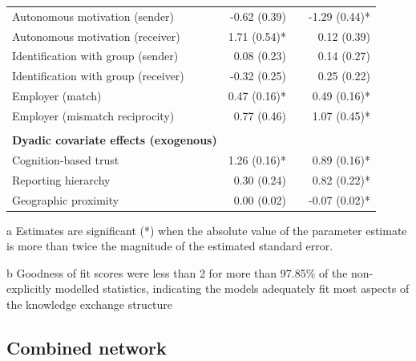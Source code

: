 \begin{table}[hbt!]
{\begin{threeparttable}
\begin{tabular}{@{}lrlr@{}}
Autonomous motivation (sender) & -0.62 (0.39)\phantom{*} &  & -1.29 (0.44)* \\
Autonomous motivation (receiver) & 1.71 (0.54)* &  & 0.12 (0.39)\phantom{*} \\
Identification with group (sender) & 0.08 (0.23)\phantom{*} &  & 0.14 (0.27)\phantom{*} \\
Identification with group (receiver) & -0.32 (0.25)\phantom{*} &  & 0.25 (0.22)\phantom{*} \\
Employer (match) & 0.47 (0.16)* &  & 0.49 (0.16)* \\
Employer (mismatch reciprocity) & 0.77 (0.46)\phantom{*} &  & 1.07 (0.45)* \\
 &  &  &  \\
\textbf{Dyadic covariate effects (exogenous)} &  &  &  \\
Cognition-based trust & 1.26 (0.16)* &  & 0.89 (0.16)* \\
Reporting hierarchy & 0.30 (0.24)\phantom{*} &  & 0.82 (0.22)* \\
Geographic proximity & 0.00 (0.02)\phantom{*} &  & -0.07 (0.02)* \\ \bottomrule
\end{tabular}
    \begin{tablenotes}
      \small
      \item[a] Estimates are significant (*) when the absolute value of the parameter estimate is more than twice the magnitude of the estimated standard error.
      \item[b] Goodness of fit scores were less than 2 for more than 97.85\% of the non-explicitly modelled statistics, indicating the models adequately fit most aspects of the knowledge exchange structure
    \end{tablenotes}
\end{threeparttable}
}
\end{table}

\subsection{Combined network}

